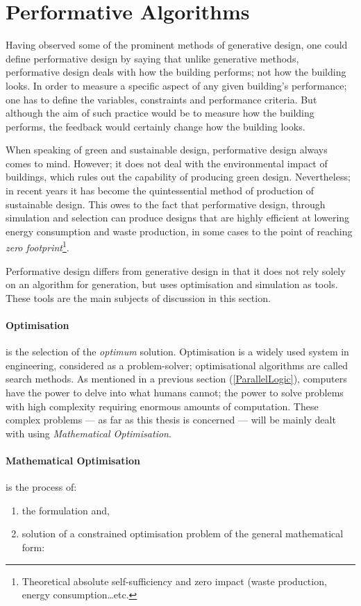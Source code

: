 \clearpage
\section{Performative Algorithms}

Having observed some of the prominent methods of generative design, one could define performative design by saying that unlike generative methods, performative design deals with how the building performs; not how the building looks. In order to measure a specific aspect of any given building's performance; one has to define the variables, constraints and performance criteria. But although the aim of such practice would be to measure how the building performs, the feedback would certainly change how the building looks.

When speaking of green and sustainable design, performative design always comes to mind. However; it does not deal with the environmental impact of buildings, which rules out the capability of producing green design. Nevertheless; in recent years it has become the quintessential method of production of sustainable design. This owes to the fact that performative design, through simulation and selection can produce designs that are highly efficient at lowering energy consumption and waste production, in some cases to the point of reaching \emph{zero footprint}\footnote{Theoretical absolute self-sufficiency and zero impact (waste production, energy consumption\ldots etc.}.

Performative design differs from generative design in that it does not rely solely on an algorithm for generation, but uses optimisation and simulation as tools. These tools are the main subjects of discussion in this section.

\paragraph{Optimisation}is the selection of the \emph{optimum} solution. Optimisation is a widely used system in engineering, considered as a problem-solver; optimisational algorithms are called search methods. As mentioned in a previous section (\ref{ParallelLogic}), computers have the power to delve into what humans cannot; the power to solve problems with high complexity requiring enormous amounts of computation. These complex problems --- as far as this thesis is concerned --- will be mainly dealt with using \emph{Mathematical Optimisation}.

\newpage
\paragraph{Mathematical Optimisation} is the process of:
\vspace{-0.5cm}
\begin{enumerate}
\item the formulation and,
\item solution of a constrained optimisation problem of the general mathematical form:
\end{enumerate}
\vspace{-0.9cm}

